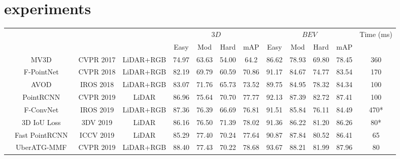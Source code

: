 \documentclass[letterpaper]{article}
\begin{document}
\else
\chapter{experiments}
\fi

\begin{table*}[t]
   \centering
   \footnotesize
\begin{tabular}{c|c|c|c|cccc|cccc|c}
       \hline
       &
       \multicolumn{1}{c|}{ \multirow{2}{*}{Method}} & \multicolumn{1}{c|}{ \multirow{2}{*}{Reference}}& \multicolumn{1}{c|}{ \multirow{2}{*}{Modality}} & \multicolumn{4}{|c|}{$3D$} & \multicolumn{4}{|c|}{$BEV$} & \multicolumn{1}{|c}{\multirow{2}{*}{Time (ms)}} \\
       \cline{5-12}
       &
       \multicolumn{1}{c|}{} & \multicolumn{1}{c|}{} & \multicolumn{1}{c|}{}& \multicolumn{1}{|c}{Easy} & \multicolumn{1}{c}{Mod} & \multicolumn{1}{c}{Hard} & \multicolumn{1}{c|}{mAP} &
       \multicolumn{1}{|c}{Easy} & \multicolumn{1}{c}{Mod} & \multicolumn{1}{c}{Hard} & \multicolumn{1}{c|}{mAP} & \multicolumn{1}{|c}{} \\
       \hline
       \hline
         \parbox[t]{2mm}{}
& MV3D~\cite{MV3D}     &CVPR 2017   & {LiDAR+RGB}   & 74.97  & 63.63  & 54.00 &64.2 &86.62 &78.93 &69.80 &78.45 & 360\\
         & F-PointNet~\cite{FPOINTNET} &CVPR 2018   & {LiDAR+RGB}   & 82.19  & 69.79  & 60.59 &70.86 &91.17 &84.67 &74.77 &83.54 & 170\\
         & AVOD~\cite{AVOD}            &IROS 2018   & {LiDAR+RGB}   & 83.07  & 71.76  & 65.73 &73.52 &89.75 &84.95 &78.32 &84.34 & 100\\
& PointRCNN~\cite{shi2019pointrcnn} &CVPR 2019   & {LiDAR}     & 86.96  & 75.64  & 70.70 &77.77 &92.13 &87.39 &82.72 & 87.41 & 100\\
         & F-ConvNet~\cite{wang2019frustum}  &IROS 2019   & {LiDAR+RGB}   & 87.36  & 76.39  & 66.69 &76.81 &91.51 &85.84 &76.11 &84.49 & 470*\\
         & 3D IoU Loss~\cite{zhou2019iou}    &3DV 2019   & {LiDAR}     & 86.16  & 76.50  & 71.39 &78.02 &91.36  &86.22  &81.20  &86.26 & 80*\\
& Fast PointRCNN~\cite{Chen2019fastpointrcnn} &ICCV 2019   & {LiDAR}     & 85.29  & 77.40  & 70.24 &77.64 &90.87 &87.84 &80.52 &86.41 & 65\\
         & UberATG-MMF~\cite{liang2019multi} &CVPR 2019   & {LiDAR+RGB}   & 88.40  & 77.43  & 70.22 &78.68 &93.67 &88.21 &81.99 &87.96 & 80\\

\end{tabular}
\end{table*}
\end{document}
